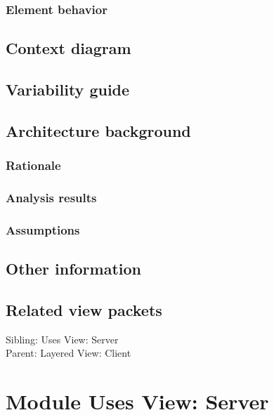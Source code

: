 \documentclass[a4paper,10pt]{article}
\begin{document}
\subsubsection{Element behavior}

\subsection{Context diagram}

\subsection{Variability guide}

\subsection{Architecture background}

\subsubsection{Rationale}

\subsubsection{Analysis results}

\subsubsection{Assumptions}

\subsection{Other information}

\subsection{Related view packets}

Sibling: Uses View: Server\\
Parent: Layered View: Client\\

\section{Module Uses View: Server}
\end{document}

